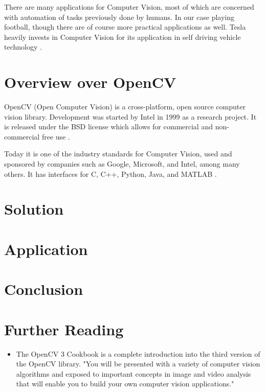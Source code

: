 \documentclass[12pt, a4paper]{article}
\begin{document}
There are many applications for Computer Vision, most of which are concerned with automation of tasks previously done by humans. In our case playing football, though there are of course more practical applications as well.
Tesla heavily invests in Computer Vision for its application in self driving vehicle technology \cite{teslaAutopilot} \cite{teslaCvArticle}.

\section{Overview over OpenCV}
OpenCV (Open Computer Vision) is a cross-platform, open source computer vision library. Development was started by Intel in 1999 as a research project. It is released under the BSD license which allows for commercial and non-commercial free use \cite{learningOpenCV}.

Today it is one of the industry standards for Computer Vision, used and sponsored by companies such as Google, Microsoft, and Intel, among many others. It has interfaces for C, C++, Python, Java, and MATLAB \cite{aboutOpenCV}.

\section{Solution}

\section{Application}

\section{Conclusion}

\section{Further Reading}
\begin{itemize}
	\item The OpenCV 3 Cookbook \cite{openCVCookbook} is a complete introduction into the third version of the OpenCV library. "You will be presented with a variety of computer vision algorithms and exposed to important concepts in image and video analysis that will enable you to build your own computer vision applications." \cite{openCVCookbookWebsite}
\end{itemize}

\printbibliography
\end{document}
